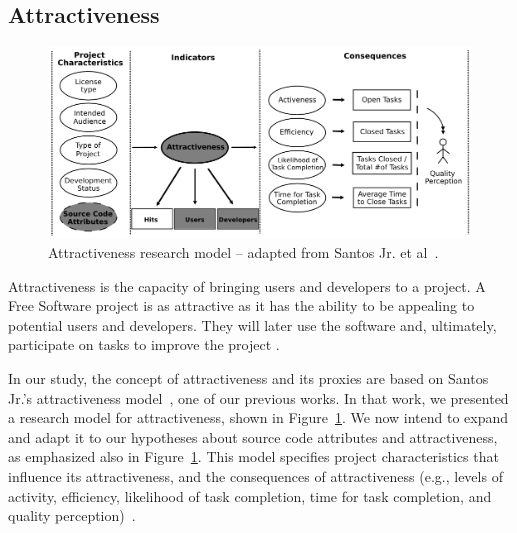 \documentclass[conference]{IEEEtran}
\begin{document}
\subsection{Attractiveness} 
\label{attract}

\begin{figure}[!t]
\centering
\includegraphics[scale=.35]{figure/attractiveness3}
\caption{Attractiveness research model
-- adapted from Santos Jr. et al~\cite{Santos2010}.}
\label{attractiveness}
\end{figure}

Attractiveness is the capacity of bringing users and developers to a project.
%
A Free Software project is as attractive as it has the ability to be appealing
to potential users and developers.
%
They will later use the software and, ultimately, participate on tasks to
improve the project \cite{Santos2010}.

In our study, the concept of attractiveness and its proxies are
based on Santos Jr.'s attractiveness model~\cite{Santos2010},
one of our previous works.
%
In that work, we presented a research model for attractiveness,
shown in Figure~\ref{attractiveness}. We now intend to expand and 
adapt it to our hypotheses about source code attributes and attractiveness,
as emphasized also in Figure~\ref{attractiveness}.
%
This model specifies project characteristics that influence its attractiveness,
and the consequences of attractiveness (e.g., levels of activity, efficiency, 
likelihood of task completion, time for task completion, 
and quality perception)~\cite{Santos2010}.
\end{document}
